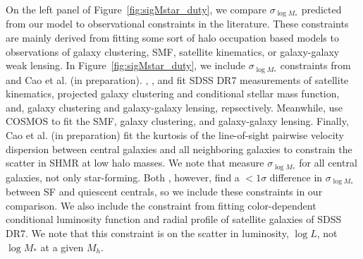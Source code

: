 \documentclass[12pt, letterpaper, preprint, tighten]{aastex62}
\begin{document}
On the left panel of Figure~\ref{fig:sigMstar_duty}, we compare 
$\sigma_{\log M_*}$ predicted from our model to observational 
constraints in the literature. These constraints are mainly derived from 
fitting some sort of halo occupation based models to observations of galaxy 
clustering, SMF, satellite kinematics, or galaxy-galaxy weak lensing. In 
Figure~\ref{fig:sigMstar_duty}, we include $\sigma_{\log M_*}$ constraints 
from~\cite{more2011, leauthaud2012, reddick2013, tinker2013, zu2015} and 
Cao et al. (in preparation). \cite{more2011}, \cite{reddick2013}, and \cite{zu2015} 
fit SDSS DR7 measurements of satellite kinematics, projected galaxy clustering and 
conditional stellar mass function, and, galaxy clustering and galaxy-galaxy 
lensing, repsectively. Meanwhile, \cite{leauthaud2012, tinker2013} 
use COSMOS to fit the SMF, galaxy clustering, and galaxy-galaxy lensing. 
Finally, Cao et al. (in preparation) fit the kurtosis of the line-of-sight 
pairwise velocity dispersion between central galaxies and all neighboring 
galaxies to constrain the scatter in SHMR at low halo masses. We note that 
\cite{leauthaud2012, reddick2013, zu2015} measure $\sigma_{\log M_*}$ for 
all central galaxies, not only star-forming. Both \cite{more2011, tinker2013}, 
however, find a $< 1\sigma$ difference in $\sigma_{\log M_*}$ between SF 
and quiescent centrals, so we include these constraints in our comparison. 
We also include the \cite{lange2018a} constraint from fitting color-dependent 
conditional luminosity function and radial profile of satellite galaxies 
of SDSS DR7. We note that this constraint is on the scatter in luminosity, 
$\log L$, not $\log M_*$ at a given $M_h$. 
\end{document}
